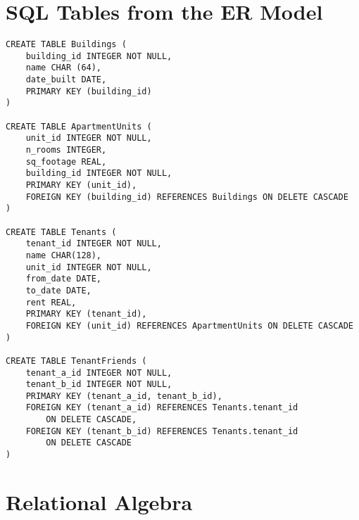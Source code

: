 \documentclass{homework}
\begin{document}
\section{SQL Tables from the ER Model}

\begin{verbatim}
CREATE TABLE Buildings (
    building_id INTEGER NOT NULL,
    name CHAR (64),
    date_built DATE,
    PRIMARY KEY (building_id)
)

CREATE TABLE ApartmentUnits (
    unit_id INTEGER NOT NULL,
    n_rooms INTEGER,
    sq_footage REAL,
    building_id INTEGER NOT NULL,
    PRIMARY KEY (unit_id),
    FOREIGN KEY (building_id) REFERENCES Buildings ON DELETE CASCADE
)

CREATE TABLE Tenants (
    tenant_id INTEGER NOT NULL,
    name CHAR(128),
    unit_id INTEGER NOT NULL,
    from_date DATE,
    to_date DATE,
    rent REAL,
    PRIMARY KEY (tenant_id),
    FOREIGN KEY (unit_id) REFERENCES ApartmentUnits ON DELETE CASCADE
)

CREATE TABLE TenantFriends (
    tenant_a_id INTEGER NOT NULL,
    tenant_b_id INTEGER NOT NULL,
    PRIMARY KEY (tenant_a_id, tenant_b_id),
    FOREIGN KEY (tenant_a_id) REFERENCES Tenants.tenant_id
        ON DELETE CASCADE,
    FOREIGN KEY (tenant_b_id) REFERENCES Tenants.tenant_id
        ON DELETE CASCADE
)
\end{verbatim}

\section{Relational Algebra}
\end{document}
